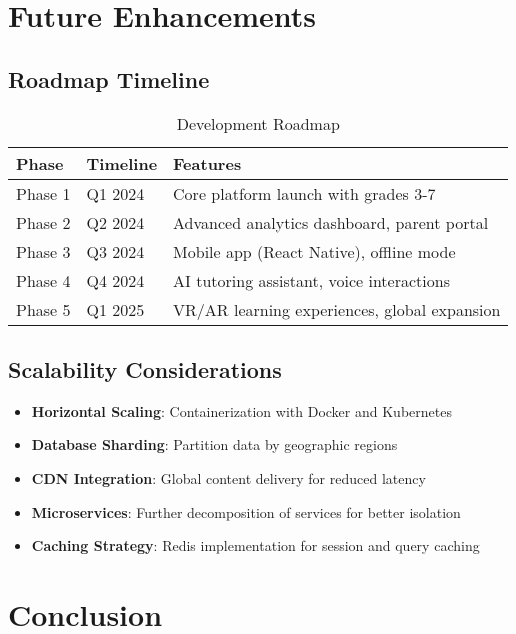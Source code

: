 \documentclass[12pt,a4paper]{article}
\begin{document}
\section{Future Enhancements}

\subsection{Roadmap Timeline}

\begin{table}[H]
\centering
\caption{Development Roadmap}
\begin{tabular}{|l|l|p{6cm}|}
\hline
\textbf{Phase} & \textbf{Timeline} & \textbf{Features} \\
\hline
Phase 1 & Q1 2024 & Core platform launch with grades 3-7 \\
\hline
Phase 2 & Q2 2024 & Advanced analytics dashboard, parent portal \\
\hline
Phase 3 & Q3 2024 & Mobile app (React Native), offline mode \\
\hline
Phase 4 & Q4 2024 & AI tutoring assistant, voice interactions \\
\hline
Phase 5 & Q1 2025 & VR/AR learning experiences, global expansion \\
\hline
\end{tabular}
\label{tab:roadmap}
\end{table}

\subsection{Scalability Considerations}

\begin{itemize}
    \item \textbf{Horizontal Scaling}: Containerization with Docker and Kubernetes
    \item \textbf{Database Sharding}: Partition data by geographic regions
    \item \textbf{CDN Integration}: Global content delivery for reduced latency
    \item \textbf{Microservices}: Further decomposition of services for better isolation
    \item \textbf{Caching Strategy}: Redis implementation for session and query caching
\end{itemize}

\section{Conclusion}
\end{document}
